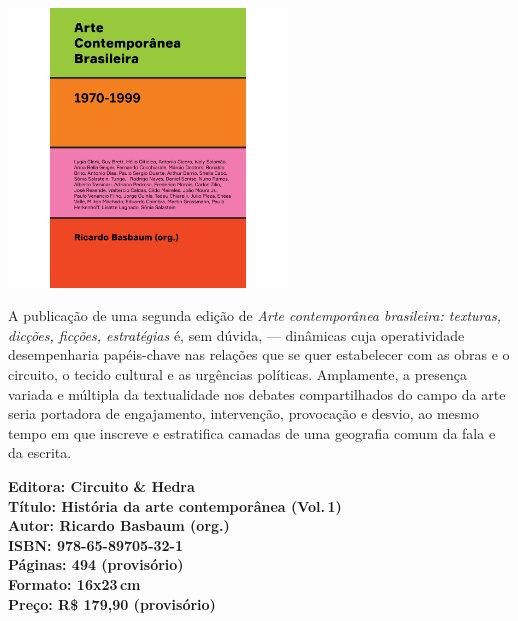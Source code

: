 \pagestyle{circuito}
\label{circuito}

\begin{center}
\hspace*{-3.6cm}
\hspace*{3.1cm}\includegraphics[width=74mm]{./CAPAS/CIRCUITO_BASBAUM.jpg}
\end{center}
\hspace*{-7cm}\hrulefill\hspace*{-7cm}
\medskip

\noindent{}A publicação de uma segunda edição de \textit{Arte contemporânea brasileira: texturas, dicções, ficções, estratégias} é, sem dúvida,  --- dinâmicas cuja operatividade desempenharia papéis-chave nas relações que se quer estabelecer com as obras e o circuito, o tecido cultural e as urgências políticas. Amplamente, a presença variada e múltipla da textualidade nos debates compartilhados do campo da arte seria portadora de engajamento, intervenção, provocação e desvio, ao mesmo tempo em que inscreve e estratifica camadas de uma geografia comum da fala e da escrita.

\vfill
\noindent\begin{minipage}[c]{1\linewidth}
{\small\textbf{
\hspace*{-.1cm}Editora: Circuito \& Hedra\\
Título: História da arte contemporânea (Vol.\,1)\\
Autor: Ricardo Basbaum (org.)\\ 
ISBN: 978-65-89705-32-1\\
Páginas: 494 (provisório)\\
Formato: 16x23\,cm\\
Preço: R\$ 179,90 (provisório)\\
}}
\end{minipage}
\pagebreak

